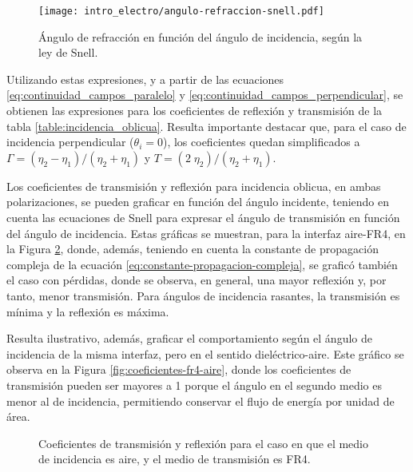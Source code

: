 \begin{figure}[htp]
	\centering
	\texttt{[image: intro\_electro/angulo-refraccion-snell.pdf]}
	\caption{Ángulo de refracción en función del ángulo de incidencia, según la ley de Snell.}
	\label{fig:ley_snell}
\end{figure}

Utilizando estas expresiones, y a partir de las ecuaciones \ref{eq:continuidad_campos_paralelo} y \ref{eq:continuidad_campos_perpendicular}, se obtienen las expresiones para los coeficientes de reflexión y transmisión de la tabla \ref{table:incidencia_oblicua}. Resulta importante destacar que, para el caso de incidencia perpendicular ($\theta_i = 0$), los coeficientes quedan simplificados a $\Gamma = (\eta_2 - \eta_1)/(\eta_2 + \eta_1)$ y $T = (2 \; \eta_2)/(\eta_2 + \eta_1)$.

Los coeficientes de transmisión y reflexión para incidencia oblicua, en ambas polarizaciones, se pueden graficar en función del ángulo incidente, teniendo en cuenta las ecuaciones de Snell para expresar el ángulo de transmisión en función del ángulo de incidencia. Estas gráficas se muestran, para la interfaz aire-FR4, en la Figura \ref{fig:coeficientes-aire-fr4}, donde, además,  teniendo en cuenta la constante de propagación compleja de la ecuación \ref{eq:constante-propagacion-compleja}, se graficó también el caso con pérdidas, donde se observa, en general, una mayor reflexión y, por tanto, menor transmisión. Para ángulos de incidencia rasantes, la transmisión es mínima y la reflexión es máxima.

Resulta ilustrativo, además, graficar el comportamiento según el ángulo de incidencia de la misma interfaz, pero en el sentido dieléctrico-aire. Este gráfico se observa en la Figura \ref{fig:coeficientes-fr4-aire}, donde los coeficientes de transmisión pueden ser mayores a 1 porque el ángulo en el segundo medio es menor al de incidencia, permitiendo conservar el flujo de energía por unidad de área.

\begin{figure}[H]
	\centering 
	\caption{Coeficientes de transmisión y reflexión para el caso en que el medio de incidencia es aire, y el medio de transmisión es FR4.}
	\label{fig:coeficientes-aire-fr4}
\end{figure}


